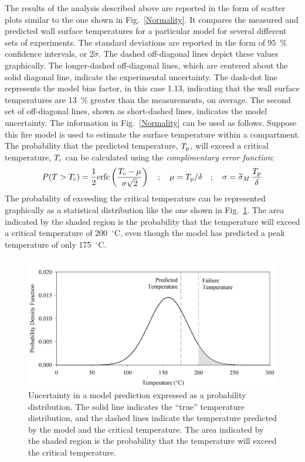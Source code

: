 \documentclass[fleqn,b5paper]{article}
\begin{document}
The results of the analysis described above are reported in the form of scatter plots similar to the one shown in Fig.~\ref{Normality}. It compares the measured and predicted wall surface temperatures for a particular model for several different sets of experiments. The standard deviations are reported in the form of 95~\% confidence intervals, or $2\widetilde{\sigma}$. The dashed off-diagonal lines depict these values graphically. The longer-dashed off-diagonal lines, which are centered about the solid diagonal line, indicate the experimental uncertainty.  The dash-dot line represents the model bias factor, in this case 1.13, indicating that the wall surface temperatures are 13~\% greater than the measurements, on average. The second set of off-diagonal lines, shown as short-dashed lines, indicates the model uncertainty. The information in Fig.~\ref{Normality} can be used as follows. Suppose this fire model is used to estimate the surface temperature within a compartment. The probability that the predicted temperature, $T_{\rm p}$, will exceed a critical temperature, $T_{\rm c}$ can be calculated using the {\em complimentary error function}:
\begin{equation}
   P(T>T_{\rm c}) = \frac{1}{2} \hbox{erfc} \left( \frac{T_{\rm c} - \mu}{\sigma \sqrt{2}} \right) \quad ; \quad \mu=T_{\rm p}/\delta \quad ; \quad \sigma = \widetilde{\sigma}_M \, \frac{T_{\rm p}}{\delta}
\end{equation}
The probability of exceeding the critical temperature can be represented graphically as a statistical distribution like the one shown in Fig.~\ref{bell_curve}. The area indicated by the shaded region is the probability that the temperature will exceed a critical temperature of 200~$^\circ$C, even though the model has predicted a peak temperature of only 175~$^\circ$C.
\begin{figure}[ht]
\begin{center}
\includegraphics[width=5.in]{../FDS_Validation_Guide/FIGURES/bell_curve}
\end{center}
\caption[Demonstration of model uncertainty.]{Uncertainty in a model prediction expressed as a probability distribution. The solid line indicates the ``true'' temperature distribution, and the dashed lines indicate the temperature predicted by the model and the critical temperature. The area indicated by the shaded region is the probability that the temperature will exceed the critical temperature.}
\label{bell_curve}
\end{figure}
\end{document}
